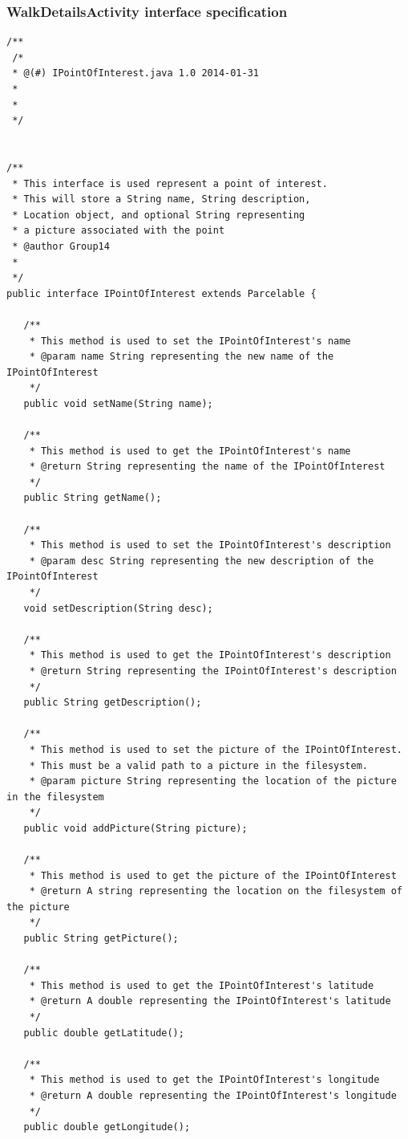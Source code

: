 \documentclass{project}
\begin{document}
\subsubsection{WalkDetailsActivity interface specification}
\begin{verbatim}/**
 /*
 * @(#) IPointOfInterest.java 1.0 2014-01-31
 *
 *
 */


/**
 * This interface is used represent a point of interest.
 * This will store a String name, String description,
 * Location object, and optional String representing
 * a picture associated with the point
 * @author Group14
 *
 */
public interface IPointOfInterest extends Parcelable {
   
   /**
    * This method is used to set the IPointOfInterest's name
    * @param name String representing the new name of the IPointOfInterest
    */
   public void setName(String name);
   
   /**
    * This method is used to get the IPointOfInterest's name
    * @return String representing the name of the IPointOfInterest
    */
   public String getName();
   
   /**
    * This method is used to set the IPointOfInterest's description
    * @param desc String representing the new description of the IPointOfInterest
    */
   void setDescription(String desc);
   
   /**
    * This method is used to get the IPointOfInterest's description
    * @return String representing the IPointOfInterest's description
    */
   public String getDescription();
   
   /**
    * This method is used to set the picture of the IPointOfInterest.
    * This must be a valid path to a picture in the filesystem.
    * @param picture String representing the location of the picture in the filesystem
    */
   public void addPicture(String picture);
   
   /**
    * This method is used to get the picture of the IPointOfInterest
    * @return A string representing the location on the filesystem of the picture
    */
   public String getPicture();
   
   /**
    * This method is used to get the IPointOfInterest's latitude
    * @return A double representing the IPointOfInterest's latitude
    */
   public double getLatitude();
   
   /**
    * This method is used to get the IPointOfInterest's longitude
    * @return A double representing the IPointOfInterest's longitude
    */
   public double getLongitude();
   

\end{verbatim}
\end{document}
